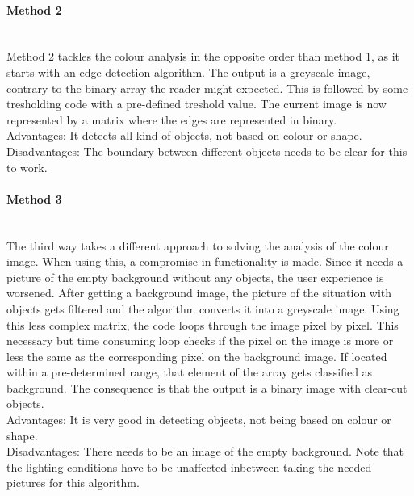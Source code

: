 \documentclass[11pt]{article}
\begin{document}
\paragraph{Method 2}\mbox{}\\
Method 2 tackles the colour analysis in the opposite order than method 1, as it starts with an edge detection algorithm. The output is a greyscale image, contrary to the binary array the reader might expected. This is followed by some tresholding code with a pre-defined treshold value. The current image is now represented by a matrix where the edges are represented in binary.
\\Advantages: It detects all kind of objects, not based on colour or shape.
\\Disadvantages: The boundary between different objects needs to be clear for this to work.

\paragraph{Method 3}\mbox{}\\
The third way takes a different approach to solving the analysis of the colour image. When using this, a compromise in functionality is made. Since it needs a picture of the empty background without any objects, the user experience is worsened. After getting a background image, the picture of the situation with objects gets filtered and the algorithm converts it into a greyscale image. Using this less complex matrix, the code loops through the image pixel by pixel. This necessary but time consuming loop checks if the pixel on the image is more or less the same as the corresponding pixel on the background image. If located within a pre-determined range, that element of the array gets classified as background. The consequence is that the output is a binary image with clear-cut objects.
\\Advantages: It is very good in detecting objects, not being based on colour or shape.
\\Disadvantages: There needs to be an image of the empty background. Note that the lighting conditions have to be unaffected inbetween taking the needed pictures for this algorithm.
\end{document}
